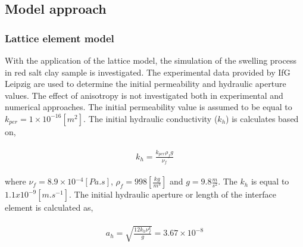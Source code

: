 

\subsection{Model approach}
\subsubsection*{Lattice element model}

With the application of the lattice model, the simulation of the swelling process in red salt clay sample is investigated. The experimental data provided by IfG Leipzig are used to determine the initial permeability and hydraulic aperture values. The effect of anisotropy is not investigated both in experimental and numerical approaches. The initial permeability value is assumed to be equal to $k_{per}=1\times10^{-16} [m^2]$. The initial hydraulic conductivity ($k_{h}$) is calculates based on,

\begin{align}
\label{eq:LEM_ME5_1}
\begin{split}
k_{h}=\frac{k_{per}\rho_fg}{\nu_f}
\end{split}
\end{align}

where $\nu_f=8.9\times{10}{^{-4} [Pa.s]}$, $\rho_f=998 [\frac{kg}{m^3}]$ and $g=9.8 \frac{m}{s^2}$. The $k_{h}$ is equal to $1.1x10^{-9} [m.s^{-1}]$. The initial hydraulic aperture or length of the interface element is calculated as,

\begin{align}
\label{eq:LEM_ME5_2}
\begin{split}
a_h=\sqrt{\frac{12k_h\nu_f^{k}}{g}}=3.67\times10^{-8}
\end{split}
\end{align}

